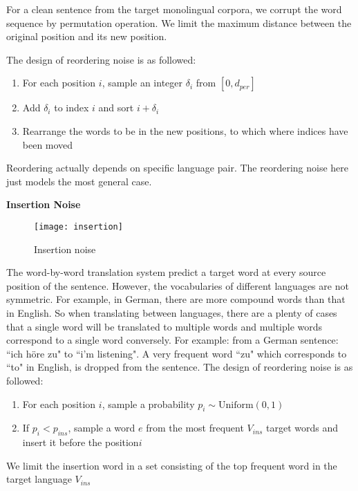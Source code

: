 	For a clean sentence from the target monolingual corpora, we corrupt the word sequence by permutation operation. We limit the maximum distance between the original position and its new position.
	
	The design of reordering noise is as followed:
	\begin{enumerate}
		\item For each position ${i}$, sample an integer ${\delta_i}$ from ${[0, d_{per}]}$
		\item Add ${\delta_{i}}$ to index ${i}$ and sort ${i+\delta_{i}}$
		\item Rearrange the words to be in the new positions, to which where indices have been moved
	\end{enumerate}

	Reordering actually depends on specific language pair. The reordering noise here just models the most general case.

	
	\textbf{Insertion Noise}\\
	\begin{figure}[ht]
	\texttt{[image: insertion]}
	\caption{Insertion noise}
	\centering
\end{figure}	

	The word-by-word translation system predict a target word at every source position of the sentence. However,  the vocabularies of different languages are not symmetric. For example, in German, there are more compound words than that in English. So when translating between languages, there are a plenty of cases that a single word will be translated to multiple words and multiple words correspond to a single word conversely. For example: from a German sentence: ``ich höre zu" to ``i'm listening". A very frequent word ``zu" which corresponds to ``to" in English, is dropped from the sentence. The design of reordering noise is as followed:
	\begin{enumerate}	
		\item For each position ${i}$, sample a probability ${p_i \sim \textrm{Uniform}(0,1)}$
		\item If ${p_i} < p_{ins}$, sample a word ${e}$ from the most frequent ${V_{ins}}$ target words and insert it before the position${i}$
	\end{enumerate}

	We limit the insertion word in a set consisting of the top frequent word in the target language ${V_{ins}}$ \\
	
